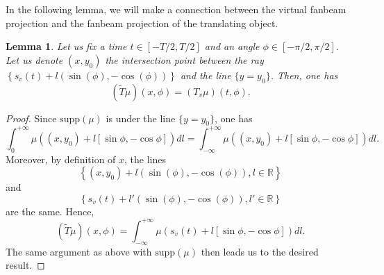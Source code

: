 \documentclass[a4paper]{article}
\numberwithin{equation}{section}
\newcommand{\R}{\mathbb{R}}
\newcommand{\supp}{\textrm{supp}}
\newtheorem{lemma}{Lemma}
\begin{document}
In the following lemma, we will make a connection between the virtual fanbeam projection and the fanbeam projection of the translating object.
\begin{lemma}
	Let us fix a time $t \in \left[ -T/2, T/2\right]$ and an angle $\phi \in \left[ -\pi/2, \pi/2\right]$. Let us denote $(x,y_0)$ the intersection point between the ray
	$ \left\{ s_v(t) + l \left( \sin(\phi), -\cos(\phi) \right) \right\} $ and the line $\{ y = y_0\}$. Then, one has
	\begin{equation}
		\left( \tilde{T}\mu	\right)(x,\phi) = \left( T_v\mu	\right)(t,\phi).
	\end{equation}
\label{lem:T_x_t}
\end{lemma}
\begin{proof}
Since $\supp(\mu)$ is under the line $\{ y=y_0 \}$, one has
\begin{equation}
	\int_0^{+\infty} \mu \left( (x,y_0) + l \left[ \sin \phi, -\cos \phi \right] \right) dl = \int_{-\infty}^{+\infty} \mu \left( (x,y_0) + l \left[ \sin \phi, -\cos \phi \right] \right) dl.
\end{equation}
Moreover, by definition of $x$, the lines
$$\left\{ (x,y_0) + l \left(\sin(\phi), -\cos(\phi) \right), l \in \R \right\}$$
and
$$\left\{ s_v(t) + l' \left(\sin(\phi), -\cos(\phi) \right), l' \in \R \right\}$$
are the same. Hence,
\begin{equation}
	\left( \tilde{T}\mu	\right)(x,\phi) = \int_{-\infty}^{+\infty} \mu \left( s_v(t) + l \left[ \sin \phi, -\cos \phi \right] \right) dl.
\end{equation}
The same argument as above with $\supp(\mu)$ then leads us to the desired result.
\end{proof}
\end{document}
